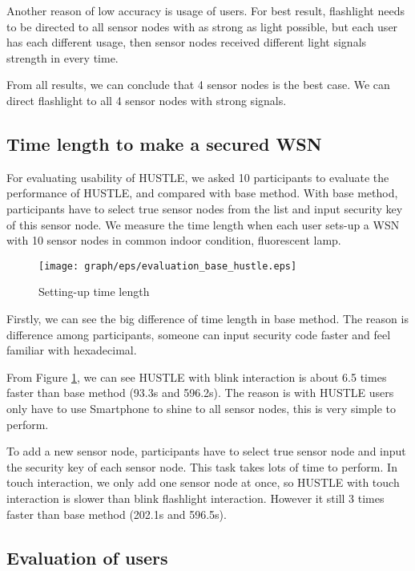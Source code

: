 Another reason of low accuracy is usage of users. For best result, flashlight needs to be directed to all sensor nodes with as strong as light possible, but each user has each different usage, then sensor nodes received different light signals strength in every time.

From all results, we can conclude that 4 sensor nodes is the best case. We can direct flashlight to all 4 sensor nodes with strong signals.

\subsection{Time length to make a secured WSN}

For evaluating usability of HUSTLE, we asked 10 participants to evaluate the performance of HUSTLE, and compared with base method. With base method, participants have to select true sensor nodes from the list and input security key of this sensor node. We measure the time length when each user sets-up a WSN with 10 sensor nodes in common indoor condition, fluorescent lamp.

\begin{figure}[t] 
\begin{center}
\texttt{[image: graph/eps/evaluation\_base\_hustle.eps]}
\caption{ Setting-up time length}
\label{fig:evaluation_time_length}
\end{center}
\end{figure}

Firstly, we can see the big difference of time length in base method. The reason is difference among participants, someone can input security code faster and feel familiar with hexadecimal.

From Figure \ref{fig:evaluation_time_length}, we can see HUSTLE with blink interaction is about 6.5 times faster than base method (93.3s and 596.2s). The reason is with HUSTLE users only have to use Smartphone to shine to all sensor nodes, this is very simple to perform.

To add a new sensor node, participants have to select true sensor node and input the security key of each sensor node. This task takes lots of time to perform. In touch interaction, we only add one sensor node at once, so HUSTLE with touch interaction is slower than blink flashlight interaction. However it still  3 times faster than base method (202.1s and 596.5s).

\subsection{Evaluation of users}


